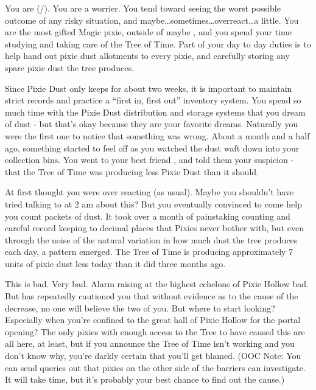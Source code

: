 \documentclass[char]{PP}
\begin{document}
\name{\cMTree{}}

You are \cMTree{} (\cMTree{\They}/\cMTree{\Them}). You are a worrier. You tend toward seeing the worst possible outcome of any risky situation, and maybe\ldots sometimes\ldots overreact\ldots a little. You are the most gifted Magic pixie, outside of maybe \cMHead{} \cMHead{\themself}, and you spend your time studying and taking care of the Tree of Time. Part of your day to day duties is to help hand out pixie dust allotments to every pixie, and carefully storing any spare pixie dust the tree produces.

Since Pixie Dust only keeps for about two weeks, it is important to maintain strict records and practice a “first in, first out” inventory system. You spend so much time with the Pixie Dust distribution and storage systems that you dream of dust - but that’s okay because they are your favorite dreams. Naturally you were the first one to notice that something was wrong. About a month and a half ago, something started to feel off as you watched the dust waft down into your collection bins. You went to your best friend \cSHelp{}, and told them your suspicion - that the Tree of Time was producing less Pixie Dust than it should.

At first \cSHelp{} thought you were over reacting (as usual). Maybe you shouldn’t have tried talking to at 2 am about this? But you eventually convinced \cSHelp{\them} to come help you count packets of dust. It took over a month of painstaking counting and careful record keeping to decimal places that Pixies never bother with, but even through the noise of the natural variation in how much dust the tree produces each day, a pattern emerged. The Tree of Time is producing approximately 7 units of pixie dust less today than it did three months ago.

This is bad. Very bad. Alarm raising at the highest echelons of Pixie Hollow bad. But \cSHelp{} has repeatedly cautioned you that without evidence as to the cause of the decrease, no one will believe the two of you. But where to start looking? Especially when you’re confined to the great hall of Pixie Hollow for the portal opening?  The only pixies with enough access to the Tree to have caused this are all here, at least, but if you announce the Tree of Time isn't working and you don't know why, you're darkly certain that you'll get blamed.  (OOC Note: You can send queries out that pixies on the other side of the barriers can investigate. It will take time, but it’s probably your best chance to find out the cause.)
\end{document}
